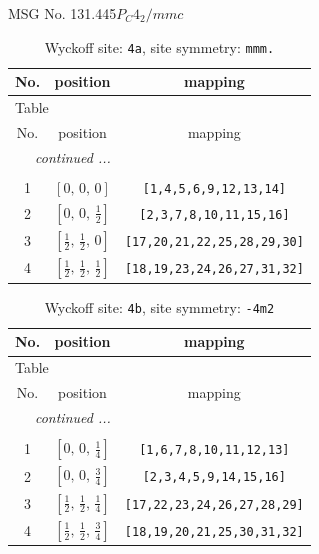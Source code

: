 \documentclass[fleqn,8pt]{jsarticle}
\begin{document}
\setcounter{MaxMatrixCols}{32}

\renewcommand{\tablename}{Table~}
\renewcommand{\figurename}{Figure~}
\begin{center}
\LARGE
MSG No. 131.445\quad$P_{C}4_{2}/mmc$
\end{center}
\renewcommand{\arraystretch}{1.2}
\begin{longtable}{ccc}
\caption{Wyckoff site: {\tt 4a}, site symmetry: {\tt mmm.}}
 \\
 \hline \hline
No. & position & mapping \\ \hline \endfirsthead

\multicolumn{2}{l}{\tablename\ \thetable{}} \\
 \hline \hline
No. & position & mapping \\ \hline \endhead

 \hline \hline
\multicolumn{2}{r}{\footnotesize\it continued ...} \\ \endfoot

 \hline \hline
\multicolumn{2}{r}{} \\ \endlastfoot

1 & $\left[ 0,\, 0,\, 0 \right]$ & {\tt [1,4,5,6,9,12,13,14]} \\ \hline
2 & $\left[ 0,\, 0,\, \frac{1}{2} \right]$ & {\tt [2,3,7,8,10,11,15,16]} \\ \hline
3 & $\left[ \frac{1}{2},\, \frac{1}{2},\, 0 \right]$ & {\tt [17,20,21,22,25,28,29,30]} \\ \hline
4 & $\left[ \frac{1}{2},\, \frac{1}{2},\, \frac{1}{2} \right]$ & {\tt [18,19,23,24,26,27,31,32]} \\
\end{longtable}
\renewcommand{\arraystretch}{1.2}
\begin{longtable}{ccc}
\caption{Wyckoff site: {\tt 4b}, site symmetry: {\tt -4m2}}
 \\
 \hline \hline
No. & position & mapping \\ \hline \endfirsthead

\multicolumn{2}{l}{\tablename\ \thetable{}} \\
 \hline \hline
No. & position & mapping \\ \hline \endhead

 \hline \hline
\multicolumn{2}{r}{\footnotesize\it continued ...} \\ \endfoot

 \hline \hline
\multicolumn{2}{r}{} \\ \endlastfoot

1 & $\left[ 0,\, 0,\, \frac{1}{4} \right]$ & {\tt [1,6,7,8,10,11,12,13]} \\ \hline
2 & $\left[ 0,\, 0,\, \frac{3}{4} \right]$ & {\tt [2,3,4,5,9,14,15,16]} \\ \hline
3 & $\left[ \frac{1}{2},\, \frac{1}{2},\, \frac{1}{4} \right]$ & {\tt [17,22,23,24,26,27,28,29]} \\ \hline
4 & $\left[ \frac{1}{2},\, \frac{1}{2},\, \frac{3}{4} \right]$ & {\tt [18,19,20,21,25,30,31,32]} \\
\end{longtable}
\end{document}
